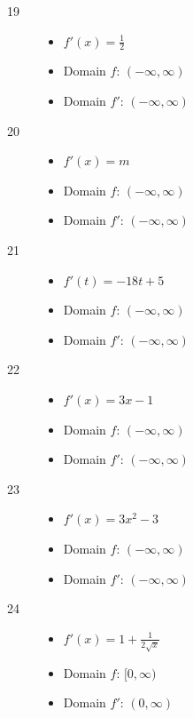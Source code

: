 \documentclass[letterpaper, landscape]{exam}
\begin{document}
\begin{description}
      \item[19]
        \begin{itemize}
          \item $f'(x) = \frac{1}{2}$
          \item Domain $f$: $(-\infty, \infty)$
          \item Domain $f'$: $(-\infty, \infty)$
        \end{itemize}

      \newpage

      \item[20]
        \begin{itemize}
          \item $f'(x) = m$
          \item Domain $f$: $(-\infty, \infty)$
          \item Domain $f'$: $(-\infty, \infty)$
        \end{itemize}

      \item[21]
        \begin{itemize}
          \item $f'(t) = -18t + 5$
          \item Domain $f$: $(-\infty, \infty)$
          \item Domain $f'$: $(-\infty, \infty)$
        \end{itemize}

      \item[22]
        \begin{itemize}
          \item $f'(x) = 3x - 1$
          \item Domain $f$: $(-\infty, \infty)$
          \item Domain $f'$: $(-\infty, \infty)$
        \end{itemize}

      \item[23]
        \begin{itemize}
          \item $f'(x) = 3x^2 - 3$
          \item Domain $f$: $(-\infty, \infty)$
          \item Domain $f'$: $(-\infty, \infty)$
        \end{itemize}

      \item[24]
        \begin{itemize}
          \item $f'(x) = 1 + \frac{1}{ 2 \sqrt{x} }$
          \item Domain $f$: $[ 0, \infty )$
          \item Domain $f'$: $( 0, \infty )$
        \end{itemize}


\end{description}
\end{document}
